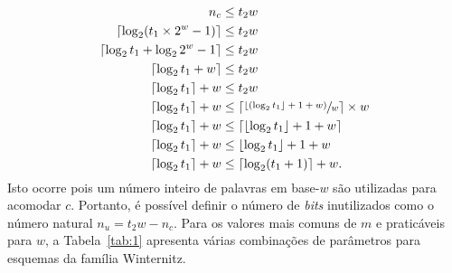 \documentclass{ufsctex/ufsctex}
\begin{document}
\begin{align}
  \begin{split}
    n_c &\leq t_2 w \\
    \lceil \log_2 (t_1 \times 2^w - 1) \rceil &\leq t_2w \\
    \lceil \log_2 t_1 + \log_2 2^w - 1 \rceil &\leq t_2w \\
    \lceil \log_2 t_1 + w \rceil &\leq t_2w \\
    \lceil \log_2 t_1 \rceil + w &\leq t_2w \\
    \lceil \log_2 t_1 \rceil + w &\leq \left\lceil
      \sfrac{\lfloor (\log_2 t_1 \rfloor + 1 + w)}{w} \right\rceil \times w \\
    \lceil \log_2 t_1 \rceil + w
      &\leq \lceil \lfloor \log_2 t_1 \rfloor + 1 + w \rceil \\
    \lceil \log_2 t_1 \rceil + w &\leq \lfloor \log_2 t_1 \rfloor + 1 + w \\
    \lceil \log_2 t_1 \rceil + w &\leq \lceil \log_2 (t_1 + 1) \rceil + w.
  \end{split}
\end{align}
Isto ocorre pois um número inteiro de palavras em base-$w$ são utilizadas para
acomodar $c$. Portanto, é possível definir o número de \emph{bits} inutilizados
como o número natural $n_u = t_2w - n_c$. Para os valores mais comuns de $m$ e
praticáveis para $w$, a Tabela~\ref{tab:1} apresenta várias combinações de
parâmetros para esquemas da família Winternitz.
\end{document}
